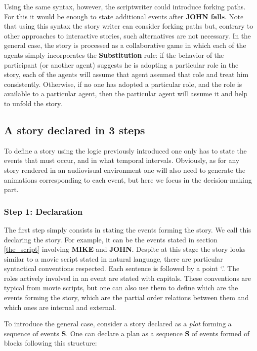 \documentclass[
		twoside,openright,titlepage,numbers=noenddot,manychapters,
		headinclude,%
                footinclude=false,cleardoublepage=empty,
                BCOR=5mm,
		fontsize=11pt, %
                 enabledeprecatedfontcommands]{scrreprt}
\begin{document}
Using the same syntax, however, the scriptwriter could introduce forking paths. For this it would be enough to state additional events after \textbf{JOHN falls}. Note that using this syntax the story writer can consider forking paths but, contrary to other approaches to interactive stories, such alternatives are not necessary. In the general case, the story is processed as a collaborative game in which each of the agents simply incorporates the \textbf{Substitution} rule: if the behavior of the participant (or another agent) suggests he is adopting a particular role in the story, each of the agents will assume that agent assumed that role and treat him consistently. Otherwise, if no one has adopted a particular role, and the role is available to a particular agent, then the particular agent will assume it and help to unfold the story. 


\subsection{A story declared in 3 steps}

To define a story using the logic previously introduced one only has to state the events that must occur, and in what temporal intervals. Obviously, as for any story rendered in an audiovisual environment one will also need to generate the animations corresponding to each event, but here we focus in the decision-making part.

\subsubsection{Step 1: Declaration}
\label{logic_des}

The first step simply consists in stating the events forming the story. We call this declaring the story. For example, it can be the events stated in  section \ref{the_script} involving \textbf{MIKE} and \textbf{JOHN}. Despite at this stage the story looks similar to a movie script stated in natural language, there are particular syntactical conventions respected. Each sentence is followed by a point ‘.’. The roles actively involved in an event are  stated with capitals. These conventions are typical from movie scripts, but one can also use them to define which are the events forming the story, which are the partial order relations between them and which ones are internal and external.

To introduce the general case, consider a story declared as a \emph{plot} forming a sequence of events \textbf{S}. One can declare a plan as a sequence \textbf{S} of events formed of blocks following this structure:
\end{document}
